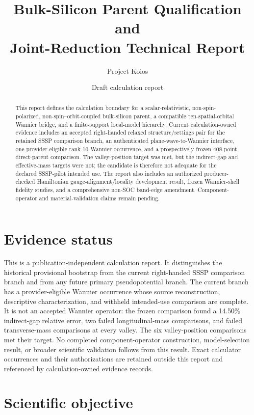 \documentclass[11pt]{article}
\title{Bulk-Silicon Parent Qualification and\\Joint-Reduction Technical Report}
\author{Project Koios}
\date{Draft calculation report}
\begin{document}
\maketitle

\begin{abstract}
This report defines the calculation boundary for a
scalar-relativistic, non-spin-polarized, non-spin--orbit-coupled bulk-silicon
parent, a compatible ten-spatial-orbital Wannier bridge, and a finite-support
local-model hierarchy.  Current calculation-owned evidence includes an accepted
right-handed relaxed structure/settings pair for the retained SSSP comparison branch,
an authenticated plane-wave-to-Wannier interface, one provider-eligible rank-10
Wannier occurrence, and a prospectively frozen 408-point direct-parent comparison.
The valley-position target was met, but the indirect-gap and effective-mass targets
were not; the candidate is therefore not adequate for the declared SSSP-pilot intended
use.  The report also includes an authorized producer-checked Hamiltonian
gauge-alignment/locality development result, frozen Wannier-shell fidelity studies,
and a comprehensive non-SOC band-edge amendment. Component-operator and
material-validation claims remain pending.
\end{abstract}

\section{Evidence status}

This is a publication-independent calculation report.  It distinguishes the historical
provisional bootstrap from the current right-handed SSSP comparison branch and from any
future primary pseudopotential branch.  The current branch has a provider-eligible
Wannier occurrence whose source reconstruction, descriptive characterization, and
withheld intended-use comparison are complete.  It is not an accepted Wannier operator:
the frozen comparison found a 14.50\% indirect-gap relative error, two failed
longitudinal-mass comparisons, and failed transverse-mass comparisons at every valley.
The six valley-position comparisons met their target.  No completed component-operator
construction, model-selection result, or broader scientific validation follows from
this result.  Exact calculator occurrences and their authorizations are retained outside
this report and referenced by calculation-owned evidence records.

\section{Scientific objective}
\end{document}
